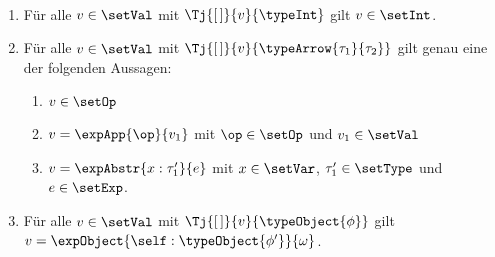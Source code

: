 \begin{lemma} \label{lemma:Losub:Canonical_Forms} \
  \begin{enumerate}
    \item F\"ur alle $v\in\setVal$ mit $\Tj{[\,]}{v}{\typeInt}$ gilt $v\in\setInt$.

    \item F\"ur alle $v\in\setVal$ mit $\Tj{[\,]}{v}{\typeArrow{\tau_1}{\tau_2}}$ gilt genau eine
          der folgenden Aussagen:
          \begin{enumerate}
            \item $v \in \setOp$
            \item $v = \expApp{\op}{v_1}$ mit $\op \in \setOp$ und $v_1 \in \setVal$
            \item $v = \expAbstr{x:\tau_1'}{e}$ mit $x\in\setVar$, $\tau_1'\in\setType$ und $e\in\setExp$.
          \end{enumerate}

    \item F\"ur alle $v\in\setVal$ mit $\Tj{[\,]}{v}{\typeObject{\phi}}$ gilt
          $v = \expObject{\self:\typeObject{\phi'}}{\omega}$.
  \end{enumerate}
\end{lemma}

